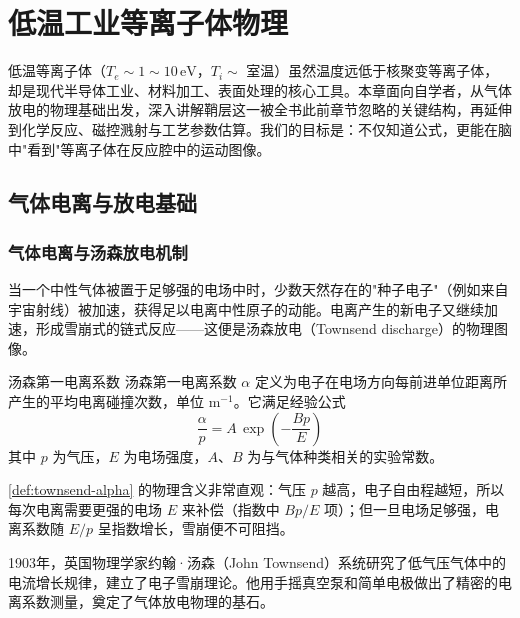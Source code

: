 \chapter{低温工业等离子体物理}
\label{ch:low-temp-industrial-plasma}

\begin{chapterintro}
低温等离子体（$T_e \sim 1\sim 10\,\mathrm{eV}$，$T_i \sim$ 室温）虽然温度远低于核聚变等离子体，却是现代半导体工业、材料加工、表面处理的核心工具。本章面向自学者，从气体放电的物理基础出发，深入讲解鞘层这一被全书此前章节忽略的关键结构，再延伸到化学反应、磁控溅射与工艺参数估算。我们的目标是：不仅知道公式，更能在脑中"看到"等离子体在反应腔中的运动图像。
\end{chapterintro}

\section{气体电离与放电基础}

\subsection{气体电离与汤森放电机制}

当一个中性气体被置于足够强的电场中时，少数天然存在的"种子电子"（例如来自宇宙射线）被加速，获得足以电离中性原子的动能。电离产生的新电子又继续加速，形成雪崩式的链式反应——这便是汤森放电（Townsend discharge）的物理图像。

\begin{definition}{汤森第一电离系数}{}{}
\label{def:townsend-alpha}
汤森第一电离系数 $\alpha$ 定义为电子在电场方向每前进单位距离所产生的平均电离碰撞次数，单位 $\mathrm{m^{-1}}$。它满足经验公式
\begin{equation}
\label{eq:townsend-alpha}
\frac{\alpha}{p} = A \,\exp\!\left(-\frac{Bp}{E}\right)
\end{equation}
其中 $p$ 为气压，$E$ 为电场强度，$A$、$B$ 为与气体种类相关的实验常数。
\end{definition}

\begin{insight}{}{}
\cref{def:townsend-alpha} 的物理含义非常直观：气压 $p$ 越高，电子自由程越短，所以每次电离需要更强的电场 $E$ 来补偿（指数中 $Bp/E$ 项）；但一旦电场足够强，电离系数随 $E/p$ 呈指数增长，雪崩便不可阻挡。
\end{insight}

\begin{history}{}{}
1903年，英国物理学家约翰·汤森（John Townsend）系统研究了低气压气体中的电流增长规律，建立了电子雪崩理论。他用手摇真空泵和简单电极做出了精密的电离系数测量，奠定了气体放电物理的基石。
\end{history}

